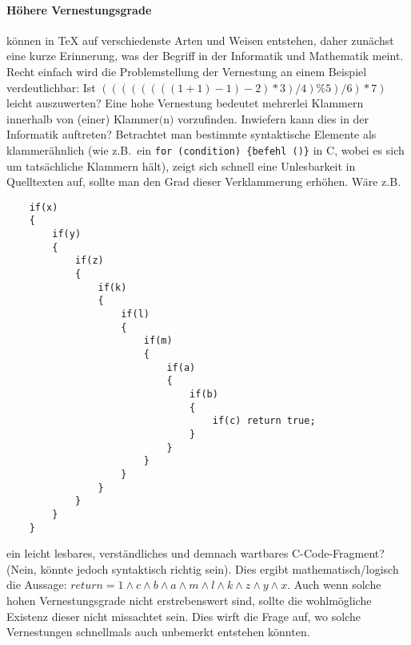 \paragraph*{Höhere Vernestungsgrade}%
können in \TeX{} auf verschiedenste Arten und Weisen entstehen, daher zunächst eine kurze Erinnerung, was der Begriff in der Informatik und Mathematik meint. Recht einfach wird die Problemstellung der Vernestung an einem Beispiel verdeutlichbar: Ist $((((((((1+1)-1)-2)*3)/4)\% 5)/6)*7)$ leicht auszuwerten? Eine hohe Vernestung bedeutet mehrerlei Klammern innerhalb von (einer) Klammer$($n$)$ vorzufinden. Inwiefern kann dies in der Informatik auftreten? Betrachtet man bestimmte syntaktische Elemente als klammerähnlich (wie z.B.\ ein \texttt{for (condition) \{befehl~()\}} in C, wobei es sich um tatsächliche Klammern hält), zeigt sich schnell eine Unlesbarkeit in Quelltexten auf, sollte man den Grad dieser Verklammerung erhöhen. Wäre z.B.\ 
\begin{verbatim}
    if(x)
    {
        if(y)
        {
            if(z)
            {
                if(k)
                {
                    if(l)
                    {
                        if(m)
                        {
                            if(a)
                            {
                                if(b)
                                {
                                    if(c) return true;
                                }
                            }
                        }
                    }
                }
            }
        }
    }
\end{verbatim}
ein leicht lesbares, verständliches und demnach wartbares C-Code-Fragment? (Nein, könnte jedoch syntaktisch richtig sein). Dies ergibt mathematisch/logisch die Aussage: $return=1\land c\land b\land a\land m\land l\land k\land z\land y\land x$. Auch wenn solche hohen Vernestungsgrade nicht erstrebenswert sind, sollte die wohlmögliche Existenz dieser nicht missachtet sein. Dies wirft die Frage auf, wo solche Vernestungen schnellmals auch unbemerkt entstehen könnten.

